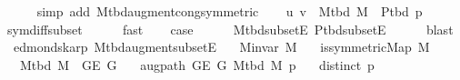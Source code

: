 \begin{isabellebody}
\ \ \ \ \isamarkupfalse%
\ {\isacharparenleft}{\kern0pt}simp\ add{\isacharcolon}{\kern0pt}\ M{\isacharunderscore}{\kern0pt}tbd{\isacharunderscore}{\kern0pt}augment{\isacharunderscore}{\kern0pt}cong{\isacharbrackleft}{\kern0pt}symmetric{\isacharbrackright}{\kern0pt}{\isacharparenright}{\kern0pt}\isanewline
\ \ \isamarkupfalse%
\ {\isachardoublequoteopen}{\isacharbraceleft}{\kern0pt}u{\isacharcomma}{\kern0pt}\ v{\isacharbraceright}{\kern0pt}\ {\isasymin}\ M{\isacharunderscore}{\kern0pt}tbd\ M\ {\isasymunion}\ P{\isacharunderscore}{\kern0pt}tbd\ {\isacharquery}{\kern0pt}p{\isachardoublequoteclose}\isanewline
\ \ \ \ \isamarkupfalse%
\ sym{\isacharunderscore}{\kern0pt}diff{\isacharunderscore}{\kern0pt}subset\isanewline
\ \ \ \ \isamarkupfalse%
\ fast\isanewline
\ \ \isamarkupfalse%
\ {\isacharquery}{\kern0pt}case\isanewline
\ \ \ \ \isamarkupfalse%
\ M{\isacharunderscore}{\kern0pt}tbd{\isacharunderscore}{\kern0pt}subset{\isacharunderscore}{\kern0pt}E\ P{\isacharunderscore}{\kern0pt}tbd{\isacharunderscore}{\kern0pt}subset{\isacharunderscore}{\kern0pt}E\isanewline
\ \ \ \ \isamarkupfalse%
\ blast\isanewline
{}\isamarkupfalse%
%
\endisatagproof
{\isafoldproof}%
%
\isadelimproof
\isanewline
%
\endisadelimproof
\isanewline
%
\isadeliminvisible
\isanewline
%
\endisadeliminvisible
%
\isataginvisible
{}\isamarkupfalse%
\ {\isacharparenleft}{\kern0pt}\ edmonds{\isacharunderscore}{\kern0pt}karp{\isacharparenright}{\kern0pt}\ M{\isacharunderscore}{\kern0pt}tbd{\isacharunderscore}{\kern0pt}augment{\isacharunderscore}{\kern0pt}subset{\isacharunderscore}{\kern0pt}E{\isacharcolon}{\kern0pt}\isanewline
\ \ \ {\isachardoublequoteopen}M{\isachardot}{\kern0pt}invar\ M{\isachardoublequoteclose}\isanewline
\ \ \ {\isachardoublequoteopen}is{\isacharunderscore}{\kern0pt}symmetric{\isacharunderscore}{\kern0pt}Map\ M{\isachardoublequoteclose}\isanewline
\ \ \ {\isachardoublequoteopen}M{\isacharunderscore}{\kern0pt}tbd\ M\ {\isasymsubseteq}\ G{\isachardot}{\kern0pt}E\ G{\isachardoublequoteclose}\isanewline
\ \ \ {\isachardoublequoteopen}augpath\ {\isacharparenleft}{\kern0pt}G{\isachardot}{\kern0pt}E\ G{\isacharparenright}{\kern0pt}\ {\isacharparenleft}{\kern0pt}M{\isacharunderscore}{\kern0pt}tbd\ M{\isacharparenright}{\kern0pt}\ p{\isachardoublequoteclose}\isanewline
\ \ \ {\isachardoublequoteopen}distinct\ p{\isachardoublequoteclose}\isanewline

\end{isabellebody}
